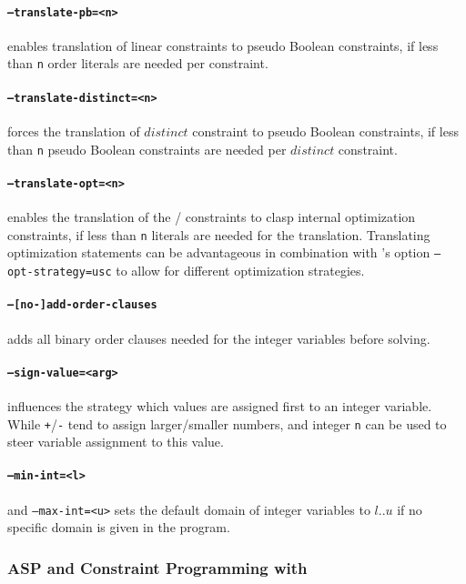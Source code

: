 \paragraph{\texttt{--translate-pb=<n>}} enables translation of linear constraints to pseudo Boolean constraints, if less than \texttt{n} order literals are needed per constraint.

\paragraph{\texttt{--translate-distinct=<n>}} forces the translation of $distinct$ constraint to pseudo Boolean constraints, if less than \texttt{n} pseudo Boolean constraints are needed per $distinct$ constraint.

\paragraph{\texttt{--translate-opt=<n>}} enables the translation of the / constraints to clasp internal optimization constraints, if less than \texttt{n} literals are needed for the translation.
Translating optimization statements can be advantageous in combination with \clingo's option \texttt{--opt-strategy=usc} to allow for different optimization strategies.

\paragraph{\texttt{--[no-]add-order-clauses}} adds all binary order clauses needed for the integer variables before solving.

\paragraph{\texttt{--sign-value=<arg>}} influences the strategy which values are assigned first to an integer variable. While \texttt{+}/\texttt{-} tend to assign larger/smaller numbers,
and integer \texttt{n} can be used to steer variable assignment to this value.

\paragraph{\texttt{--min-int=<l>}} and \texttt{--max-int=<u>} sets the default domain of integer variables to $l..u$ if no specific domain is given in the program.

\subsubsection{ASP and Constraint Programming with \gringo}

